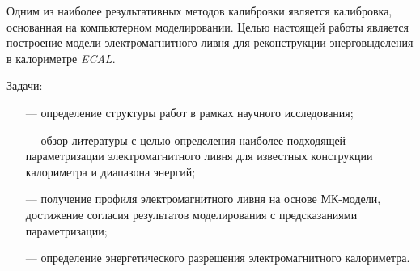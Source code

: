 Одним из наиболее результативных методов калибровки является калибровка, основанная на компьютерном моделировании. Целью настоящей работы является построение модели электромагнитного ливня для реконструкции энерговыделения в калориметре \textit{ECAL}.

Задачи:

 \begin{itemize}[leftmargin=1.6\parindent, wide]
 	\item[---] определение структуры работ в рамках научного исследования;
 		\item[---] обзор литературы с целью определения наиболее подходящей параметризации электромагнитного ливня для известных конструкции калориметра и диапазона энергий;
 			\item[---] получение профиля электромагнитного ливня на основе МК-модели, достижение согласия результатов моделирования с предсказаниями параметризации;
 				\item[---] определение энергетического разрешения электромагнитного калориметра.
 \end{itemize}
